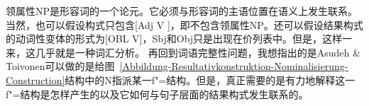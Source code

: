 领属性NP是形容词的一个论元。它必须与形容词的主语位置在语义上发生联系。当然，也可以假设构式只包含[Adj V ]，即不包含领属性NP。还可以假设结果构式的动词性变体的形式为[OBL V]，Sbj和Obj只是出现在价列表中。但是，这样一来，这几乎就是一种词汇分析。
    再回到词语完整性问题，我想指出的是Asudeh \& Toivonen可以做的是给图~\ref{Abbildung-Resultativkonstruktion-Nominalisierung-Construction}结构中的N指派某一f"=结构。但是，真正需要的是有力地解释这一f"=结构是怎样产生的以及它如何与句子层面的结果构式发生联系的。

